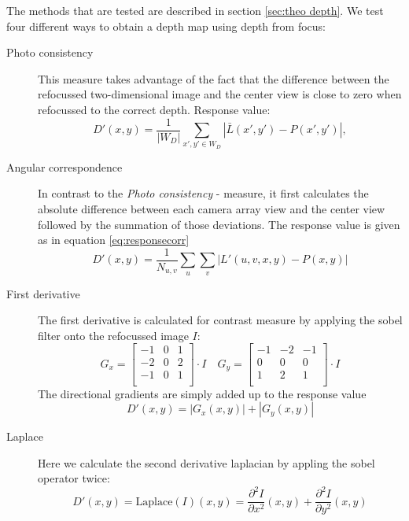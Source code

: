 \documentclass  [
  paper    = a4,
  BCOR     = 10mm,
  twoside,
  fontsize = 12pt,
  fleqn,
  toc      = bibnumbered,
  toc      = listofnumbered,
  numbers  = noendperiod,
  headings = normal,
  listof   = leveldown,
  version  = 3.03
]                                       {scrreprt}
\begin{document}
The methods that are tested are described in section \ref{sec:theo depth}. We test four different ways to obtain a depth map using depth from focus:
\begin{description}
	\item[Photo consistency] This measure takes advantage of the fact that the difference between the refocussed two-dimensional image and the center view is close to zero when refocussed to  the correct depth. Response value:
	\begin{equation}\label{key}
	D'(x,y) = \frac{1}{|W_D|}\sum_{x',y' \in W_D} \left|\bar{L}(x',y')- P(x', y')\right|,
	\end{equation}
	\item[Angular correspondence] In contrast to the \textit{Photo consistency} - measure, it first calculates the absolute difference between each camera array view and the center view followed by the summation of those deviations. The response value is given as in equation \eqref{eq:responsecorr}
	\begin{equation}\label{key}
	D'(x,y) = \frac{1}{N_{u,v}}\sum_{u}\sum_{v}  \left|L'(u, v, x, y) - P(x,y)\right|
	\end{equation}
	
	\item[First derivative] The first derivative is calculated for contrast measure by applying the sobel filter onto the refocussed image $I$:
	\begin{equation}\label{key}
	 G_x=
	 \left[ {\begin{array}{ccc}
	 	-1 & 0 & 1 \\
	 	-2 & 0 & 2 \\
	 	-1 & 0 & 1 \\
	 	\end{array} } \right] \cdot I \quad G_y=
	 \left[ {\begin{array}{ccc}
	 	-1 &-2 &-1 \\
	 	0 & 0 & 0 \\
	 	1 & 2 & 1 \\
	 	\end{array} } \right] \cdot I
	\end{equation} 
	The directional gradients are simply added up to the response value
	\begin{equation}\label{key}
	D'(x,y) = |G_x(x,y)| + |G_y(x,y)|
	\end{equation}
	\item[Laplace] Here we calculate the second derivative laplacian by appling the sobel operator twice:\begin{equation}\label{key}
	D'(x,y) = \text{Laplace}(I)(x,y) = \frac{\partial^2 I}{\partial x^2}(x,y) + \frac{\partial^2 I}{\partial y^2}(x,y)
	\end{equation}
\end{description}
\end{document}
